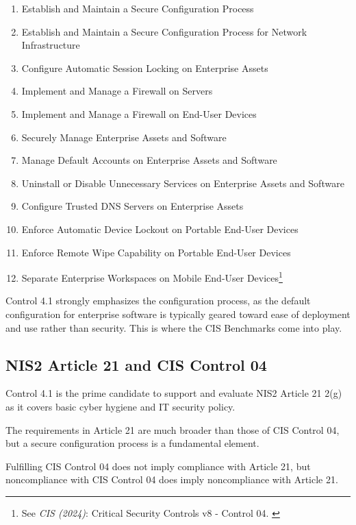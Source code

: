 \begin{enumerate}
    \item Establish and Maintain a Secure Configuration Process
    \item Establish and Maintain a Secure Configuration Process for
Network Infrastructure
    \item Configure Automatic Session Locking on Enterprise Assets
    \item Implement and Manage a Firewall on Servers
    \item Implement and Manage a Firewall on End-User Devices
    \item Securely Manage Enterprise Assets and Software
    \item Manage Default Accounts on Enterprise Assets and Software
    \item Uninstall or Disable Unnecessary Services on Enterprise Assets
and Software
    \item Configure Trusted DNS Servers on Enterprise Assets
    \item Enforce Automatic Device Lockout on Portable End-User Devices
    \item Enforce Remote Wipe Capability on Portable End-User Devices
    \item Separate Enterprise Workspaces on Mobile End-User Devices\footnote{See \textit{CIS (2024)}: Critical Security Controls v8 - Control 04. \cite{cisControls}}
\end{enumerate}

Control 4.1 strongly emphasizes the configuration process, as the default configuration for enterprise software is typically geared toward ease of deployment and use rather than security. This is where the CIS Benchmarks come into play.

\subsection{NIS2 Article 21 and CIS Control 04}

Control 4.1 is the prime candidate to support and evaluate NIS2 Article 21 2(g) as it covers basic cyber hygiene and IT security policy.

The requirements in Article 21 are much broader than those of CIS Control 04, but a secure configuration process is a fundamental element.

Fulfilling CIS Control 04 does not imply compliance with Article 21, but noncompliance with CIS Control 04 does imply noncompliance with Article 21.

